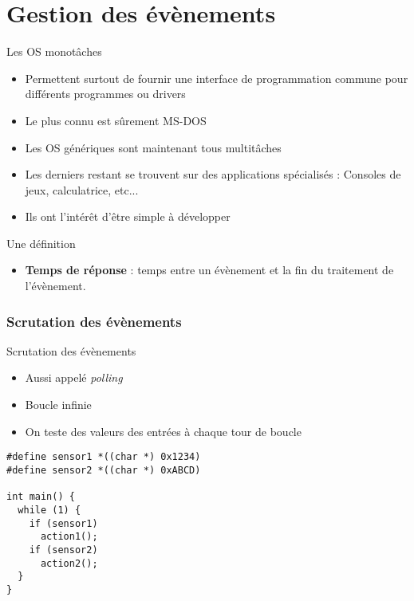 %
%
%

\part{Gestion des évènements}

\begin{frame}
  \partpage
\end{frame}

\begin{frame}
  \tableofcontents[currentpart]
\end{frame}

\begin{frame}{Les OS monotâches}
  \begin{itemize}
  \item Permettent  surtout de fournir une  interface de programmation
    commune pour différents programmes ou drivers
  \item Le plus connu est sûrement MS-DOS
  \item Les OS génériques sont maintenant tous multitâches
  \item  Les  derniers  restant   se  trouvent  sur  des  applications
    spécialisés : Consoles de jeux, calculatrice, etc...
  \item Ils ont l'intérêt d'être simple à développer
  \end{itemize}
\end{frame}

\begin{frame}{Une définition}
  \begin{itemize}
  \item \textbf{Temps de réponse} : temps entre un évènement et la fin
    du traitement de l'évènement.
  \end{itemize}
\end{frame}

\section{Scrutation des évènements}
\begin{frame}[fragile]{Scrutation des évènements}
  \begin{itemize}
  \item Aussi appelé \emph{polling}
  \item Boucle infinie
  \item On teste des valeurs des entrées à chaque tour de boucle
  \end{itemize}
  \begin{lstlisting}
#define sensor1 *((char *) 0x1234)
#define sensor2 *((char *) 0xABCD)

int main() {
  while (1) {
    if (sensor1)
      action1();
    if (sensor2)
      action2();
  }
}
  \end{lstlisting}
\end{frame}

